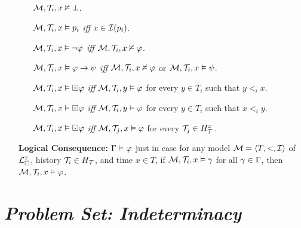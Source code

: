 \documentclass[a4paper, 11pt]{article} %
\begin{document}
\begin{enumerate}[leftmargin=1.2in]
\begin{itemize}[leftmargin=.15in]
      \item[] $\M, \T_i, x \nvDash \bot$.
      \item[] $\M, \T_i, x \vDash p_i$ \textit{iff} $x \in \I(p_i)$.
      \item[] $\M, \T_i, x \vDash \neg \metaA$ \textit{iff} $\M, \T_i, x\nvDash \metaA$.
      \item[] $\M, \T_i, x \vDash \metaA\rightarrow \metaB$ \textit{iff} $\M, \T_i, x\nvDash \metaA$ or $\M, \T_i, x \vDash  \metaB$.
      \item[] $\M, \T_i, x \vDash \Past \metaA$ \textit{iff} $\M, \T_i, y\vDash \metaA$ for every $y \in T_i$ such that $y <_i x$.
      \item[] $\M, \T_i, x \vDash \Future \metaA$ \textit{iff} $\M, \T_i, y\vDash \metaA$ for every $y \in T_i$ such that $x <_i y$.
      \item[] $\M, \T_i, x \vDash \Inevitably \metaA$ \textit{iff} $\M, \T_j, x\vDash \metaA$ for every $\T_j \in H_\T^x$.
    \end{itemize}
  \item[\bf Logical Consequence:] $\MetaG \MLmodels[] \metaA$ just in case for any model $\M = \tuple{T, <, \I}$ of $\TL_\square$, history $\T_i \in H_\T$, and time $x \in T$, if $\M, \T_i, x \vDash \metaG$ for all $\metaG \in \MetaG$, then $\M, \T_i, x \vDash \metaA$.
\end{enumerate}




\section*{\it Problem Set: Indeterminacy}
\end{document}
